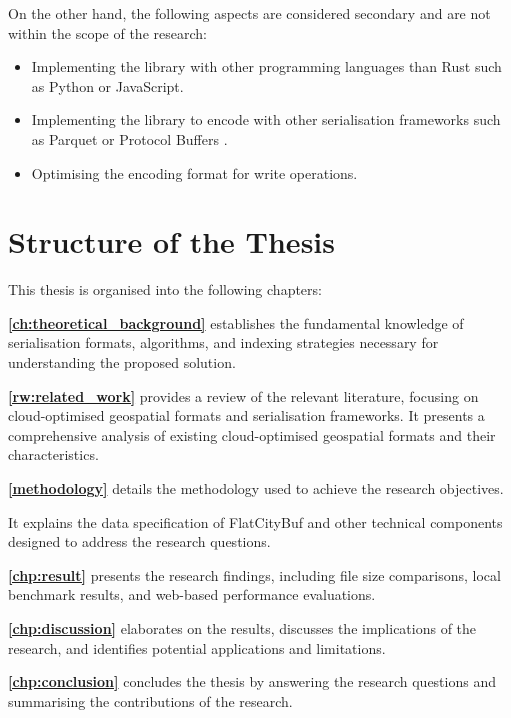 On the other hand, the following aspects are considered secondary and are not within the scope of the research:
\begin{itemize}
  \item Implementing the library with other programming languages than Rust such as Python or JavaScript.
  \item Implementing the library to encode with other serialisation frameworks such as Parquet \citep{parquet} or Protocol Buffers \citep{protobuf}.
  \item Optimising the encoding format for write operations.
\end{itemize}

\section{Structure of the Thesis}
\label{introduction:structure_of_the_thesis}

This thesis is organised into the following chapters:

\textbf{\autoref{ch:theoretical_background}} establishes the fundamental knowledge of serialisation formats, algorithms, and indexing strategies necessary for understanding the proposed solution.

\textbf{\autoref{rw:related_work}} provides a review of the relevant literature, focusing on cloud-optimised geospatial formats and serialisation frameworks.
It presents a comprehensive analysis of existing cloud-optimised geospatial formats and their characteristics.

\textbf{\autoref{methodology}} details the methodology used to achieve the research objectives.

It explains the data specification of FlatCityBuf and other technical components designed to address the research questions.

\textbf{\autoref{chp:result}} presents the research findings, including file size comparisons, local benchmark results, and web-based performance evaluations.

\textbf{\autoref{chp:discussion}} elaborates on the results, discusses the implications of the research, and identifies potential applications and limitations.

\textbf{\autoref{chp:conclusion}} concludes the thesis by answering the research questions and summarising the contributions of the research.